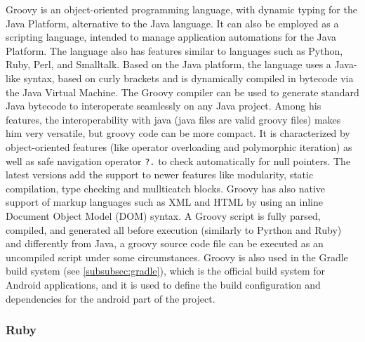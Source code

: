 Groovy is an object-oriented programming language, with dynamic typing for the Java Platform, alternative to the Java language. It can also be employed as a scripting language, intended to manage application automations for the Java Platform. The language also has features similar to languages such as Python, Ruby, Perl, and Smalltalk. Based on the Java platform, the language uses a Java-like syntax, based on curly brackets and is dynamically compiled in bytecode via the Java Virtual Machine. The Groovy compiler can be used to generate standard Java bytecode to interoperate seamlessly on any Java project. Among his features, the interoperability with java (java files are valid groovy files) makes him very versatile, but groovy code can be more compact. It is characterized by object-oriented features (like operator overloading and polymorphic iteration) as well as safe navigation operator \texttt{?.} to check automatically for null pointers. The latest versions add the support to newer features like modularity, static compilation, type checking and mullticatch blocks. Groovy has also native support of markup languages such as XML and HTML by using an inline Document Object Model (DOM) syntax. A Groovy script is fully parsed, compiled, and generated all before execution (similarly to Pyrthon and Ruby) and differently from Java, a groovy source code file can be executed as an uncompiled script under some circumstances\cite{Groovy}. Groovy is also used in the Gradle build system (see \cref{subsubsec:gradle}), which is the official build system for Android applications, and it is used to define the build configuration and dependencies for the android part of the project.  

\subsubsection{Ruby}

